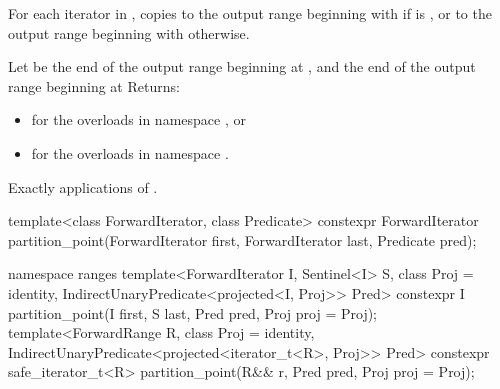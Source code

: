 \begin{itemdescr}
\pnum
\effects For each iterator  in , copies 
to the output range beginning with  if
  is , or
to the output range beginning with  otherwise.

\pnum
\returns
{}
\begin{addedblock}
Let  be the end of the output range beginning at ,
and  the end of the output range beginning at 
Returns:
\begin{itemize}
\item {} for the overloads in namespace , or
\item {} for the overloads in namespace .
\end{itemize}
\end{addedblock}

\pnum
\complexity Exactly  applications of 
.
\end{itemdescr}

%
\begin{itemdecl}
template<class ForwardIterator, class Predicate>
  constexpr ForwardIterator
    partition_point(ForwardIterator first, ForwardIterator last, Predicate pred);
\end{itemdecl}
\begin{addedblock}
\begin{itemdecl}
namespace ranges {
  template<ForwardIterator I, Sentinel<I> S, class Proj = identity,
      IndirectUnaryPredicate<projected<I, Proj>> Pred>
    constexpr I partition_point(I first, S last, Pred pred, Proj proj = Proj{});
  template<ForwardRange R, class Proj = identity,
      IndirectUnaryPredicate<projected<iterator_t<R>, Proj>> Pred>
    constexpr safe_iterator_t<R>
      partition_point(R&& r, Pred pred, Proj proj = Proj{});
}
\end{itemdecl}
\end{addedblock}

